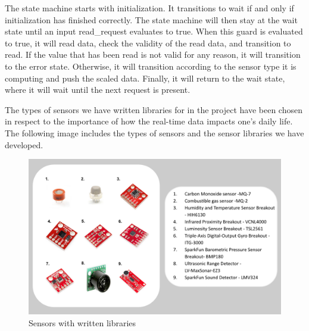 \documentclass[10pt,twocolumn]{article}
\begin{document}
The state machine starts with initialization. It transitions to wait if and only if initialization has finished correctly. The state machine will then stay at the wait state until an input read\_request evaluates to true. When this guard is evaluated to true, it will read data, check the validity of the read data, and transition to read. If the value that has been read is not valid for any reason, it will transition to the error state. Otherwise, it will transition according to the sensor type it is computing and push the scaled data. Finally, it will return to the wait state, where it will wait until the next request is present.

The types of sensors we have written libraries for in the project have been chosen in respect to the importance of how the real-time data impacts one's daily life. The following image includes the types of sensors and the sensor libraries we have developed.
\begin{figure}[h]
  \centering
    \includegraphics[scale=0.345]{sensorhardware.png}
  \caption{Sensors with written libraries}
  \label{fig:sensors}
\end{figure}
\end{document}
